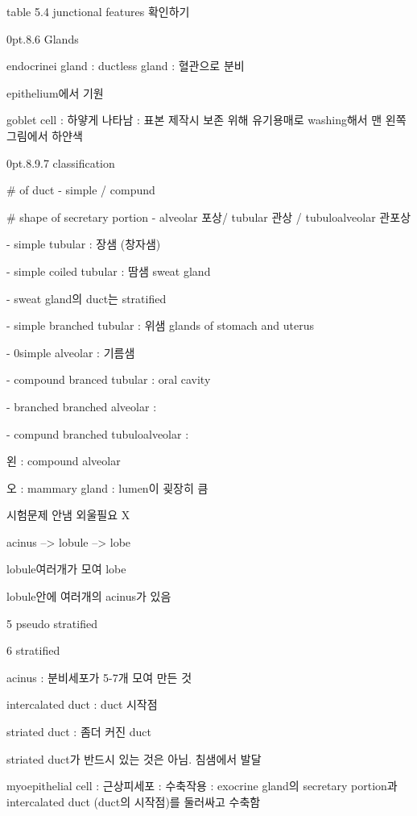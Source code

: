 \documentclass[10pt]{amsart}
\makeatletter
\numberwithin{theorem}{section}
\numberwithin{example}{section}
\theoremstyle{definition}
\theoremstyle{remark}
\renewcommand\section{\@startsection{section}{1}%
{0pt}{.8\linespacing\@plus\linespacing}{.6\linespacing}%
{\LARGE\bfseries\color{black}}}
\renewcommand\subsection{\@startsection{subsection}{2}%
{0pt}{.8\linespacing\@plus.9\linespacing}{.7\linespacing}%
{\Large\bfseries\color{black}}}
\makeatother
\begin{document}
table 5.4 junctional features 확인하기 


\section{Glands}


endocrinei gland : ductless gland : 혈관으로 분비 

epithelium에서 기원 


goblet cell : 하얗게 나타남 : 표본 제작시 보존 위해 유기용매로 washing해서 맨 왼쪽 그림에서 하얀색 

\subsection{classification}

# of duct - simple / compund

# shape of secretary portion - alveolar 포상/ tubular 관상 / tubuloalveolar 관포상


- simple tubular : 장샘 (창자샘)

- simple coiled tubular : 땀샘 sweat gland 

- sweat gland의 duct는 stratified

- simple branched tubular : 위샘 glands of stomach and uterus

- 0simple alveolar : 기름샘

- compound branced tubular : oral cavity

- branched branched alveolar : 

- compund branched tubuloalveolar : 

왼 : compound alveolar

오 : mammary gland : lumen이 굊장히 큼 

시험문제 안냄 외울필요 X


acinus --> lobule --> lobe 

lobule여러개가 모여 lobe

lobule안에 여러개의 acinus가 있음 

5 pseudo stratified

6 stratified

acinus : 분비세포가 5-7개 모여 만든 것 

intercalated duct : duct 시작점 

striated duct : 좀더 커진 duct 

striated duct가 반드시 있는 것은 아님. 침샘에서 발달 

myoepithelial cell : 근상피세포 : 수축작용 : exocrine gland의 secretary portion과 intercalated duct (duct의 시작점)를 둘러싸고 수축함
\end{document}
